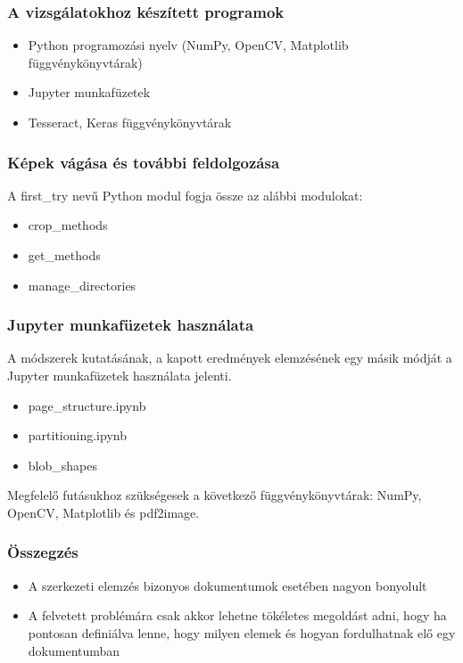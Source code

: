 \documentclass{beamer}
\begin{document}
\begin{frame}[fragile]
\frametitle{A vizsgálatokhoz készített programok}

\begin{itemize}
    \item Python programozási nyelv (NumPy, OpenCV, Matplotlib függvénykönyvtárak)
    \item Jupyter munkafüzetek
    \item Tesseract, Keras függvénykönyvtárak
\end{itemize}

\end{frame}

\begin{frame}[fragile]
\frametitle{Képek vágása és további feldolgozása}

A first\_try nevű Python modul fogja össze az alábbi modulokat:

\bigskip

\begin{itemize}
    \item crop\_methods
    \item get\_methods
    \item manage\_directories
\end{itemize}

\end{frame}

\begin{frame}[fragile]
\frametitle{Jupyter munkafüzetek használata}

A módszerek kutatásának, a kapott eredmények elemzésének egy másik módját a Jupyter munkafüzetek használata jelenti.

\bigskip

\begin{itemize}
    \item page\_structure.ipynb
    \item partitioning.ipynb
    \item blob\_shapes
\end{itemize}

\bigskip

Megfelelő futásukhoz szükségesek a következő függvénykönyvtárak: NumPy, OpenCV, Matplotlib és pdf2image.

\end{frame}

\begin{frame}[fragile]
\frametitle{Összegzés}

\begin{itemize}
    \item A szerkezeti elemzés bizonyos dokumentumok esetében nagyon bonyolult
    \item A felvetett problémára csak akkor lehetne tökéletes megoldást adni, hogy ha pontosan definiálva lenne, hogy milyen elemek és hogyan fordulhatnak elő egy dokumentumban
\end{itemize}

\end{frame}
\end{document}
